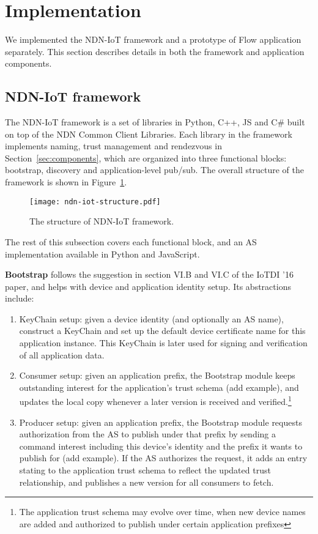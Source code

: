 \section{Implementation}
\label{sec:implementation}

We implemented the NDN-IoT framework and a prototype of Flow application separately.
This section describes details in both the framework and application components.

\subsection{NDN-IoT framework}

The NDN-IoT framework is a set of libraries in Python, C++, JS and C\# built on top of the NDN Common Client Libraries.
Each library in the framework implements naming, trust management and rendezvous in Section~\ref{sec:components}, which are organized into three functional blocks: bootstrap, discovery and application-level pub/sub.
The overall structure of the framework is shown in Figure~\ref{fig:ndn-iot-framework-structure}.

\begin{figure}[!t]
\centering
\texttt{[image: ndn-iot-structure.pdf]}
\caption{The structure of NDN-IoT framework.}
\label{fig:ndn-iot-framework-structure}
\end{figure}

The rest of this subsection covers each functional block, and an AS implementation available in Python and JavaScript.

\textbf{Bootstrap} follows the suggestion in section VI.B and VI.C of the IoTDI '16 paper, and helps with device and application identity setup. Its abstractions include: 
\begin{enumerate}
\item KeyChain setup: given a device identity (and optionally an AS name), construct a KeyChain and set up the default device certificate name for this application instance. This KeyChain is later used for signing and verification of all application data.
\item Consumer setup: given an application prefix, the Bootstrap module keeps outstanding interest for the application's trust schema (add example), and updates the local copy whenever a later version is received and verified.\footnote{The application trust schema may evolve over time, when new device names are added and authorized to publish under certain application prefixes}
\item Producer setup: given an application prefix, the Bootstrap module requests authorization from the AS to publish under that prefix by sending a command interest including this device's identity and the prefix it wants to publish for (add example). If the AS authorizes the request, it adds an entry stating to the application trust schema to reflect the updated trust relationship, and publishes a new version for all consumers to fetch.
\end{enumerate}


